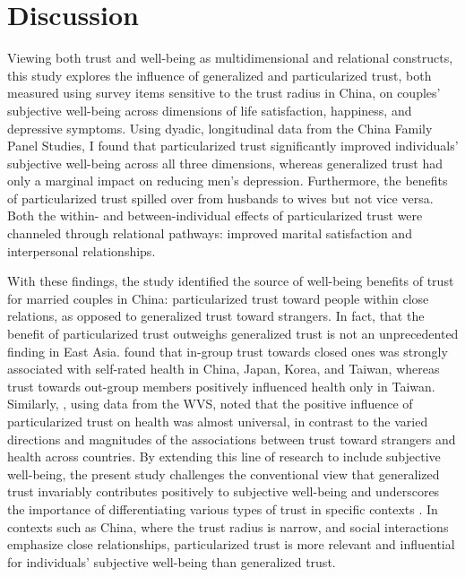 \section{Discussion}
\label{sec:ch4-discussion}

Viewing both trust and well-being as multidimensional and relational constructs, this study explores the influence of generalized and particularized trust, both measured using survey items sensitive to the trust radius in China, on couples' subjective well-being across dimensions of life satisfaction, happiness, and depressive symptoms. Using dyadic, longitudinal data from the China Family Panel Studies, I found that particularized trust significantly improved individuals' subjective well-being across all three dimensions, whereas generalized trust had only a marginal impact on reducing men's depression. Furthermore, the benefits of particularized trust spilled over from husbands to wives but not vice versa. Both the within- and between-individual effects of particularized trust were channeled through relational pathways: improved marital satisfaction and interpersonal relationships.

With these findings, the study identified the source of well-being benefits of trust for married couples in China: particularized trust toward people within close relations, as opposed to generalized trust toward strangers. In fact, that the benefit of particularized trust outweighs generalized trust is not an unprecedented finding in East Asia. \textcite{sungIngroupTrustSelfrated2020} found that in-group trust towards closed ones was strongly associated with self-rated health in China, Japan, Korea, and Taiwan, whereas trust towards out-group members positively influenced health only in Taiwan. Similarly, \textcite{sungTrustHealthCrossnational2019}, using data from the WVS, noted that the positive influence of particularized trust on health was almost universal, in contrast to the varied directions and magnitudes of the associations between trust toward strangers and health across countries. By extending this line of research to include subjective well-being, the present study challenges the conventional view that generalized trust invariably contributes positively to subjective well-being and underscores the importance of differentiating various types of trust in specific contexts \parencite{delheyHowGeneralTrust2011,nannestadWhatHaveWe2008}. In contexts such as China, where the trust radius is narrow, and social interactions emphasize close relationships, particularized trust is more relevant and influential for individuals' subjective well-being than generalized trust.

